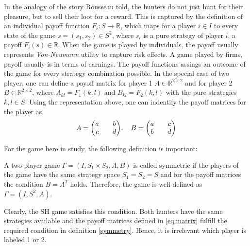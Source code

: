 \documentclass[11pt]{article}
\newcommand{\realnumb}{\mathbb{R}}
\begin{document}
In the analogy of the story Rousseau told, the hunters do not just hunt
for their pleasure, but to sell their loot for a reward. 
This is captured by the definition of an individual
payoff function $F_i:S \rightarrow \realnumb$, which maps for a player $i \in
I$ to every state of the game $s=(s_1,s_2) \in S^2$, where $s_i$ is a 
pure strategy of player $i$, a payoff $F_i(s) \in \realnumb$.
When the game is played by individuals, the payoff usually represents 
\textit{Von-Neumann} utility to capture risk effects. A game played by
firms, payoff usually is in terms of earnings.
The payoff functions assings an outcome of the game for every strategy 
combination possible.
In the special case of two player, one 
can define a payoff matrix for player 1 $A \in \realnumb^{2 \times2}$ and for 
player 2  $B \in \realnumb^{2 \times2}$, where $A_{kl} = F_1(k,l)$ and $
B_{kl} = F_2(k,l)$ with the pure strategies $k,l \in S$. Using the 
representation above, one can indentify the payoff matrices for the player as
\begin{align}
     A = \mqty(a && b \\ c && d), \quad B = \mqty(a && c \\ b && d)
        \label{eq:matrix}
\end{align}

For the game here in study, the following definition is important: 
\begin{mydef}
        A two player game $\Gamma=(I,S_1 \times S_2, A,B)$ is called symmetric
        if the players of the game have the same strategy space $S_1=S_2=S$ and
        for the payoff matrices the condition $B=A^T$ holds. Therefore, the
        game is well-defined as $\Gamma=(I,S^2,A)$.
        \label{symmetry}
\end{mydef}
Clearly, the SH game satisfies this condition. Both hunters have the same 
strategies available and the payoff matrices defined in 
\eqref{eq:matrix} fulfill the required condition in definition
\ref{symmetry}. Hence, it is irrelevant which player is labeled 1 or 2.
\end{document}
